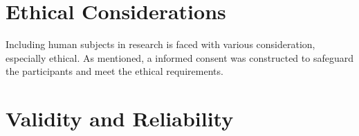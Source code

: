 \section{Ethical Considerations}
Including human subjects in research is faced with various consideration, especially ethical. As mentioned, a informed consent was constructed to safeguard the participants and meet the ethical requirements. 

\section{Validity and Reliability}


     


